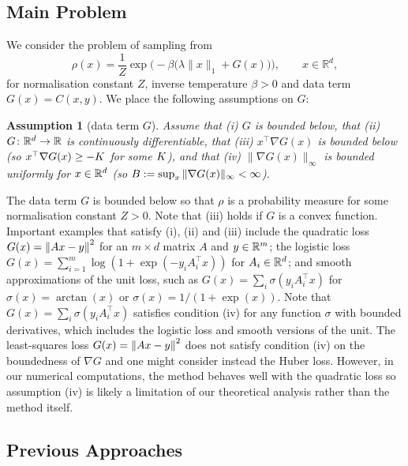 \documentclass{article}
\newtheorem{assumption}[theorem]{Assumption}
\begin{document}
\subsection{Main Problem}
We consider the problem of sampling from
\begin{equation}
\rho(x)=
\frac 1 Z\exp\bigl(-\beta\bigl(\lambda \|x\|_1 + G(x)\bigr)\bigr),\qquad x\in \mathbb{R}^d,\label{target}
\end{equation}
for normalisation constant $Z$, inverse temperature $\beta > 0$ and data term $G(x) = C(x,y)$. We place the following assumptions on $G$:
\begin{assumption}[data term $G$]\label{reg1} Assume that (i) $G$ is bounded below, that (ii) $G\colon \mathbb{R}^d\to \mathbb{R}$ is continuously differentiable, that  (iii) $x^\top\nabla G(x)$ is bounded below (so $x^\top\nabla G(x) \geq -K$ for some $K$), and that (iv)  $\|\nabla G(x)\|_\infty$ is bounded uniformly for $x\in \mathbb{R}^d$ (so $B := \sup_x\|\nabla G(x)\|_\infty < \infty$).
\end{assumption}

The data term $G$ is bounded below so that $\rho$ is a probability measure for some normalisation constant $Z>0$. Note that (iii) holds if $G$ is a convex function. Important examples that satisfy (i), (ii) and (iii) include the quadratic loss $G(x) = \left\lVert A x - y\right\rVert^2$ for an $m\times d$ matrix $A$ and $y\in \mathbb{R}^m$; the logistic loss $G(x)=\sum_{i=1}^m \log( 1+ \exp(-y_i A_i^\top x) )$ for $A_i\in\mathbb{R}^d$; and smooth approximations of the unit loss,  such as $G(x) = \sum_i \sigma(y_i A_i^\top x)$ for $\sigma(x)=\arctan(x)$ or $\sigma(x)=1/(1+\exp(x))$.
Note that  $G(x) = \sum_i \sigma(y_i A_i^\top x)$  satisfies condition (iv) for any function $\sigma$ with bounded derivatives, which includes the logistic loss and smooth versions of the unit.  The least-squares loss $G(x)=\left\lVert Ax-y\right\rVert^2$ does not satisfy condition (iv) on the boundedness of $\nabla G$ and one might consider instead the Huber loss. However, in our numerical computations, the method behaves well with the quadratic loss so assumption (iv) is likely a limitation of our theoretical analysis rather than the method itself.
\subsection{Previous Approaches}
\end{document}
